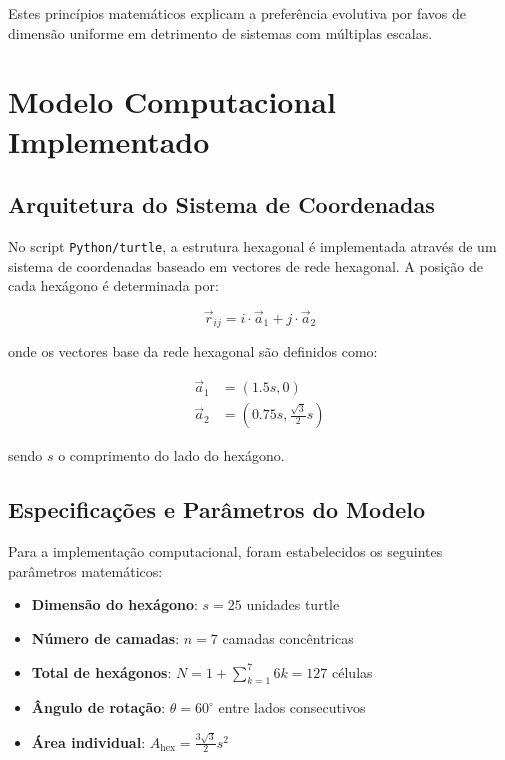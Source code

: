 \documentclass[12pt,a4paper,oneside]{extarticle}
\begin{document}
Estes princípios matemáticos explicam a preferência evolutiva por favos de dimensão uniforme em detrimento de sistemas com múltiplas escalas.

\section{Modelo Computacional Implementado}

\subsection{Arquitetura do Sistema de Coordenadas}
No script \texttt{Python/turtle}, a estrutura hexagonal é implementada através de um sistema de coordenadas baseado em vectores de rede hexagonal. A posição de cada hexágono é determinada por:

\begin{equation}
\vec{r}_{ij} = i \cdot \vec{a}_1 + j \cdot \vec{a}_2
\label{eq:hexagonal_grid}
\end{equation}

onde os vectores base da rede hexagonal são definidos como:

\begin{align}
\vec{a}_1 &= \left(1.5s, 0\right) \\
\vec{a}_2 &= \left(0.75s, \frac{\sqrt{3}}{2}s\right)
\label{eq:base_vectors}
\end{align}

sendo $s$ o comprimento do lado do hexágono.

\subsection{Especificações e Parâmetros do Modelo}
Para a implementação computacional, foram estabelecidos os seguintes parâmetros matemáticos:

\begin{itemize}
    \item \textbf{Dimensão do hexágono}: $s = 25$ unidades turtle
    \item \textbf{Número de camadas}: $n = 7$ camadas concêntricas
    \item \textbf{Total de hexágonos}: $N = 1 + \sum_{k=1}^{7} 6k = 127$ células
    \item \textbf{Ângulo de rotação}: $\theta = 60^\circ$ entre lados consecutivos
    \item \textbf{Área individual}: $A_{\text{hex}} = \frac{3\sqrt{3}}{2}s^2$
\end{itemize}
\end{document}
